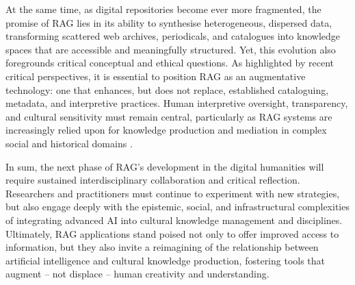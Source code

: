 \begin{spacing}{1.5}
At the same time, as digital repositories become ever more fragmented, the promise of RAG lies in its ability to synthesise heterogeneous, dispersed data, transforming scattered web archives, periodicals, and catalogues into knowledge spaces that are accessible and meaningfully structured. Yet, this evolution also foregrounds critical conceptual and ethical questions. As highlighted by recent critical perspectives, it is essential to position RAG as an augmentative technology: one that enhances, but does not replace, established cataloguing, metadata, and interpretive practices. Human interpretive oversight, transparency, and cultural sensitivity must remain central, particularly as RAG systems are increasingly relied upon for knowledge production and mediation in complex social and historical domains \citep{di_marcantonio_intelligenza_2024}.

In sum, the next phase of RAG’s development in the digital humanities will require sustained interdisciplinary collaboration and critical reflection. Researchers and practitioners must continue to experiment with new strategies, but also engage deeply with the epistemic, social, and infrastructural complexities of integrating advanced AI into cultural knowledge management and disciplines. Ultimately, RAG applications stand poised not only to offer improved access to information, but they also invite a reimagining of the relationship between artificial intelligence and cultural knowledge production, fostering tools that augment -- not displace -- human creativity and understanding.
\end{spacing}